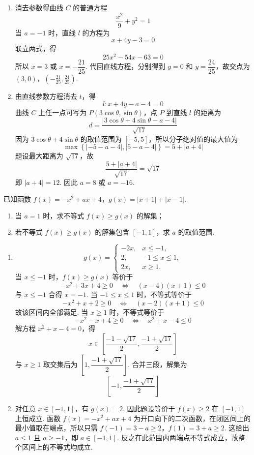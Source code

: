 \begin{solution}
\begin{enumerate}
\item 消去参数得曲线 \(C\) 的普通方程
\[
\frac{x^2}{9}+y^2=1
\]
当 \(a=-1\) 时，直线 \(l\) 的方程为
\[
x+4y-3=0
\]
联立两式，得
\[
25x^2-54x-63=0
\]
所以 \(x=3\) 或 \(x=-\dfrac{21}{25}\). 代回直线方程，分别得到 \(y=0\) 和 \(y=\dfrac{24}{25}\)，故交点为
\((3,0)\)，\(\left(-\frac{21}{25},\frac{24}{25}\right)\).

\item 由直线参数方程消去 \(t\)，得
\[
l:x+4y-a-4=0
\]
曲线 \(C\) 上任一点可写为 \(P(3\cos\theta,\sin\theta)\)，点 \(P\) 到直线 \(l\) 的距离为
\[
d=\frac{\left|3\cos\theta+4\sin\theta-a-4\right|}{\sqrt{17}}
\]
因为 \(3\cos\theta+4\sin\theta\) 的取值范围为 \([-5,5]\)，所以分子绝对值的最大值为
\[
\max\left\{\left|-5-a-4\right|,\left|5-a-4\right|\right\}
=5+\lvert a+4\rvert
\]
题设最大距离为 \(\sqrt{17}\)，故
\[
\frac{5+\lvert a+4\rvert}{\sqrt{17}}=\sqrt{17}
\]
即 \(\lvert a+4\rvert=12\). 因此 \(a=8\) 或 \(a=-16\).
\end{enumerate}
\end{solution}

\begin{problem}
已知函数 \(f(x)=-x^2+ax+4\)，\(g(x)=\lvert x+1\rvert+\lvert x-1\rvert\).

\begin{enumerate}
\item 当 \(a=1\) 时，求不等式 \(f(x)\ge g(x)\) 的解集；
\item 若不等式 \(f(x)\ge g(x)\) 的解集包含 \([-1,1]\)，求 \(a\) 的取值范围.
\end{enumerate}
\end{problem}

\begin{solution}
\begin{enumerate}
\item
\[
g(x)=
\begin{cases}
-2x,&x\le-1,\\
2,&-1\le x\le1,\\
2x,&x\ge1.
\end{cases}
\]
当 \(x\le-1\) 时，\(f(x)\ge g(x)\) 等价于
\[
-x^2+3x+4\ge0
\quad\Longleftrightarrow\quad
(x-4)(x+1)\le0
\]
与 \(x\le-1\) 合得 \(x=-1\). 当 \(-1\le x\le1\) 时，不等式等价于
\[
-x^2+x+2\ge0
\quad\Longleftrightarrow\quad
(x-2)(x+1)\le0
\]
故该区间内全部满足. 当 \(x\ge1\) 时，不等式等价于
\[
-x^2-x+4\ge0
\quad\Longleftrightarrow\quad
x^2+x-4\le0
\]
解方程 \(x^2+x-4=0\)，得
\[
x\in\left[\frac{-1-\sqrt{17}}2,\frac{-1+\sqrt{17}}2\right]
\]
与 \(x\ge1\) 取交集后为 \(\left[1,\dfrac{-1+\sqrt{17}}2\right]\). 合并三段，解集为
\[
\left[-1,\frac{-1+\sqrt{17}}2\right]
\]

\item 对任意 \(x\in[-1,1]\)，有 \(g(x)=2\). 因此题设等价于 \(f(x)\ge2\) 在 \([-1,1]\) 上恒成立. 函数 \(f(x)=-x^2+ax+4\) 为开口向下的二次函数，在闭区间上的最小值取在端点，所以只需
\(f(-1)=3-a\ge2\)，\(f(1)=3+a\ge2\).
这给出 \(a\le1\) 且 \(a\ge-1\)，即 \(a\in[-1,1]\). 反之在此范围内两端点不等式成立，故整个区间上的不等式均成立.
\end{enumerate}
\end{solution}
